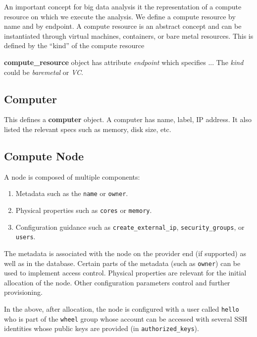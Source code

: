 \documentclass[9pt,twocolumn,twoside]{styles/osajnl}
\begin{document}
An important concept for big data analysis it the representation of a
compute resource on which we execute the analysis. We define a compute
resource by name and by endpoint. A compute resource is an abstract
concept and can be instantiated through virtual machines, containers,
or bare metal resources. This is defined by the “kind” of the compute
resource 

\textbf{compute\_resource} object has attribute \textit{endpoint} which
specifies ... The \textit{kind} could be \textit{baremetal} or \textit{VC}.


\subsection{Computer}

This defines a \textbf{computer} object. A computer has name, label,
IP address. It also listed the relevant specs such as memory, disk
size, etc.



\subsection{Compute Node}

A node is composed of multiple components:

\begin{enumerate}
\item Metadata such as the \verb|name| or \verb|owner|.
\item Physical properties such as \verb|cores| or \verb|memory|.
\item Configuration guidance such as \verb|create_external_ip|,
  \verb|security_groups|, or \verb|users|.
\end{enumerate}

The metadata is associated with the node on the provider end (if
supported) as well as in the database. Certain parts of the metadata
(such as \verb|owner|) can be used to implement access
control. Physical properties are relevant for the initial allocation
of the node. Other configuration parameters control and further
provisioning.

In the above, after allocation, the node is configured with a user
called \verb|hello| who is part of the \verb|wheel| group whose
account can be accessed with several SSH identities whose public keys
are provided (in \verb|authorized_keys|).
\end{document}
